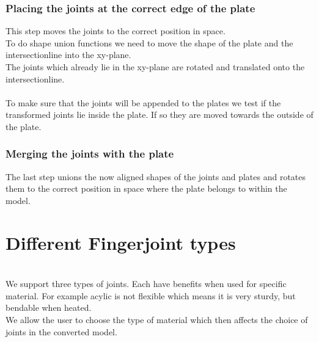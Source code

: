 \documentclass[../ClassicThesis.tex]{subfiles}
\begin{document}
\subsubsection*{Placing the joints at the correct edge of the plate}
This step moves the joints to the correct position in space. 
\*\\
To do shape union functions we need to move the shape of the plate and the intersectionline into the xy-plane.
\*\\
The joints which already lie in the xy-plane are rotated and translated onto the intersectionline.\\
\*\\
To make sure that the joints will be appended to the plates we test if the transformed joints lie inside the plate. If so they are moved towards the outside of the plate.
            
\subsubsection*{Merging the joints with the plate}
The last step unions the now aligned shapes of the joints and plates and rotates them to the correct position in space where the plate belongs to within the model.


\section{Different Fingerjoint types}

\\
We support three types of joints. Each have benefits when used for specific material. For example acylic is not flexible which means it is very sturdy, but bendable when heated. \\
We allow the user to choose the type of material which then affects the choice of joints in the converted model.
\end{document}
